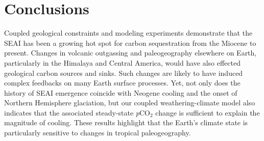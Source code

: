 \documentclass[9pt,twocolumn,twoside,lineno]{pnas-new}
\newcommand{\pCOtwo}{\textit{p}CO$_{2}$\xspace}
\begin{document}
\section*{Conclusions}

Coupled geological constraints and modeling experiments demonstrate that the SEAI has been a growing hot spot for carbon sequestration from the Miocene to present. Changes in volcanic outgassing and paleogeography elsewhere on Earth, particularly in the Himalaya and Central America, would have also effected geological carbon sources and sinks. Such changes are likely to have induced complex feedbacks on many Earth surface processes. Yet, not only does the history of SEAI emergence coincide with Neogene cooling and the onset of Northern Hemisphere glaciation, but our coupled weathering-climate model also indicates that the associated steady-state \pCOtwo change is sufficient to explain the magnitude of cooling. These results highlight that the Earth's climate state is particularly sensitive to changes in tropical paleogeography.
\end{document}
